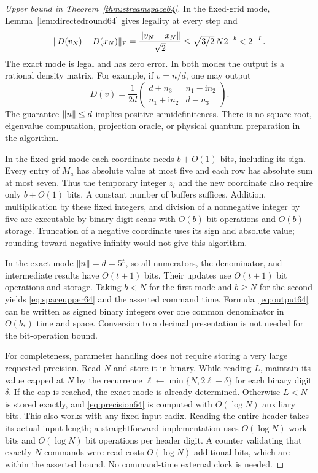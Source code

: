 \begin{proof}[Upper bound in Theorem~\ref{thm:streamspace64}]
In the fixed-grid mode, Lemma~\ref{lem:directedround64} gives legality
at every step and
\[
 \|D(v_N)-D(x_N)\|_{\rm F}
   =\frac{\lVert v_N-x_N\rVert}{\sqrt2}
   \le\sqrt{3/2}\,N2^{-b}<2^{-L}.
\]
The exact mode is legal and has zero error. In both modes the output
is a rational density matrix. For example, if $v=n/d$, one may output
\begin{equation}\label{eq:output64}
 D(v)=\frac1{2d}
 \begin{pmatrix}d+n_3&n_1-\mathrm i n_2\\
                  n_1+\mathrm i n_2&d-n_3\end{pmatrix}.
\end{equation}
The guarantee $\lVert n\rVert\le d$ implies positive semidefiniteness.
There is no square root, eigenvalue computation, projection oracle, or
physical quantum preparation in the algorithm.

In the fixed-grid mode each coordinate needs $b+O(1)$ bits, including
its sign. Every entry of $M_a$ has absolute value at most five and each
row has absolute sum at most seven. Thus the temporary integer $z_i$
and the new coordinate also require only $b+O(1)$ bits. A constant
number of buffers suffices. Addition, multiplication by these fixed
integers, and division of a nonnegative integer by five are executable
by binary digit scans with $O(b)$ bit operations and $O(b)$ storage.
Truncation of a negative coordinate uses its sign and absolute value;
rounding toward negative infinity would not give this algorithm.

In the exact mode $\lVert n\rVert=d=5^t$, so all numerators, the denominator,
and intermediate results have $O(t+1)$ bits. Their updates use
$O(t+1)$ bit operations and storage. Taking $b<N$ for the first mode
and $b\ge N$ for the second yields \eqref{eq:spaceupper64} and the
asserted command time. Formula~\eqref{eq:output64} can be written as
signed binary integers over one common denominator in $O(b_*)$ time
and space. Conversion to a decimal presentation is not needed for the
bit-operation bound.

For completeness, parameter handling does not require storing a very
large requested precision. Read $N$ and store it in binary. While
reading $L$, maintain its value capped at $N$ by the recurrence
$\ell\leftarrow\min\{N,2\ell+\delta\}$ for each binary digit
$\delta$. If the cap is reached, the exact mode is already determined.
Otherwise $L<N$ is stored exactly, and \eqref{eq:precision64} is
computed with $O(\log N)$ auxiliary bits. This also works with any
fixed input radix. Reading the entire header takes its actual input
length; a straightforward implementation uses $O(\log N)$ work bits
and $O(\log N)$ bit operations per header digit. A counter validating
that exactly $N$ commands were read costs $O(\log N)$ additional bits,
which are within the asserted bound. No command-time external clock
is needed.
\end{proof}

